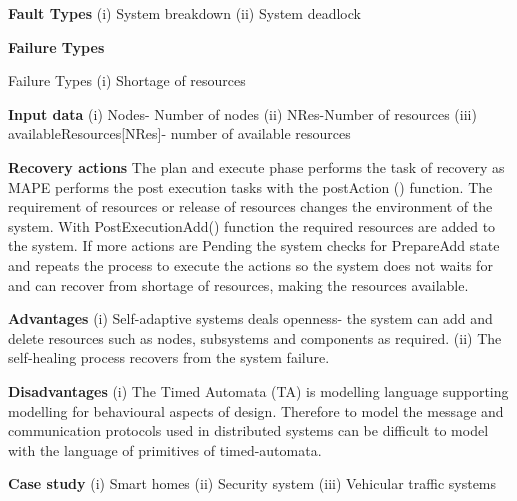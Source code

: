 \begin{compactitem}
\item[\textbf{Fault Types}]
(i) System breakdown (ii) System deadlock
\item[\textbf{Failure Types}]

Failure Types (i) Shortage of resources
\item[\textbf{Input data}] 
(i) Nodes- Number of nodes (ii) NRes-Number of resources
(iii) availableResources[NRes]- number of available resources


\item[\textbf{Recovery actions}]
The plan and execute phase performs the task of recovery as MAPE performs the post execution tasks with the postAction () function. The requirement of resources or release of resources changes the environment of the system. With PostExecutionAdd() function the required resources are added to the system. If more actions are Pending the system checks for PrepareAdd state and repeats the process to execute the actions so the system does not waits for and can recover from shortage of resources, making the resources available.


\item[\textbf{Advantages}] 
(i) Self-adaptive systems deals openness- the system can add and delete resources such as nodes, subsystems and components as required.
(ii) The self-healing process recovers from the system failure.

\item[\textbf{Disadvantages}] 
(i) The Timed Automata (TA) is modelling language supporting modelling for behavioural aspects of design. Therefore to model the message and communication protocols used in distributed systems can be difficult to model with the language of primitives of timed-automata.

\item[\textbf{Case study}] 
(i) Smart homes (ii) Security system (iii) Vehicular traffic systems

\end{compactitem}
